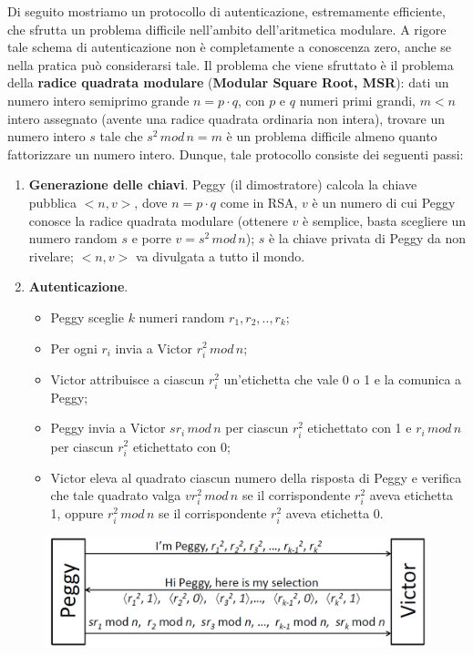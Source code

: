 Di seguito mostriamo un protocollo di autenticazione, estremamente efficiente, che sfrutta un problema difficile nell'ambito dell'aritmetica modulare. A rigore tale schema di autenticazione non è completamente a conoscenza zero, anche se nella pratica può considerarsi tale. 
\newline \newline
Il problema che viene sfruttato è il problema della \textbf{radice quadrata modulare} (\textbf{Modular Square Root, MSR}): dati un numero intero semiprimo grande $n=p \cdot q$, con $p$ e $q$ numeri primi grandi, $m<n$ intero assegnato (avente una radice quadrata ordinaria non intera), trovare un numero intero $s$ tale che $s^2 \, mod \, n=m$ è un problema difficile almeno quanto fattorizzare un numero intero. Dunque, tale protocollo consiste dei seguenti passi: 
\begin{enumerate}
\item \textbf{Generazione delle chiavi}. Peggy (il dimostratore) calcola la chiave pubblica $<n,v>$, dove $n=p \cdot q$ come in RSA, $v$ è un numero di cui Peggy conosce la radice quadrata modulare (ottenere $v$ è semplice, basta scegliere un numero random $s$ e porre $v = s^2 \, mod \, n$); $s$ è la chiave privata di Peggy da non rivelare; $<n,v>$ va divulgata a tutto il mondo.
\item \textbf{Autenticazione}. \begin{itemize}
\item Peggy sceglie $k$ numeri random $r_{1},r_{2},..,r_{k}$;
\item Per ogni $r_{i}$ invia a Victor $r_{i}^2 \, mod \, n$;
\item Victor attribuisce a ciascun $r_{i}^2$ un'etichetta che vale 0 o 1 e la comunica a Peggy;
\item Peggy invia a Victor $sr_{i} \, mod \, n$ per ciascun $r_{i}^2$ etichettato con 1 e $r_{i} \, mod \, n$ per ciascun $r_{i}^2$ etichettato con 0;
\item Victor eleva al quadrato ciascun numero della risposta di Peggy e verifica che tale quadrato valga $vr_{i}^2 \, mod \, n$ se il corrispondente $r_{i}^2$ aveva etichetta 1, oppure $r_{i}^2 \, mod \, n$ se il corrispondente $r_{i}^2$ aveva etichetta 0.
\end{itemize}
\end{enumerate}
\begin{figure}[htbp]
	\centering%
	\subfigure%
	{\includegraphics[scale=0.6, keepaspectratio]{Immagini/chiave_pubblica/zkasmsr_auth.png}}
	\caption{}
\end{figure}

